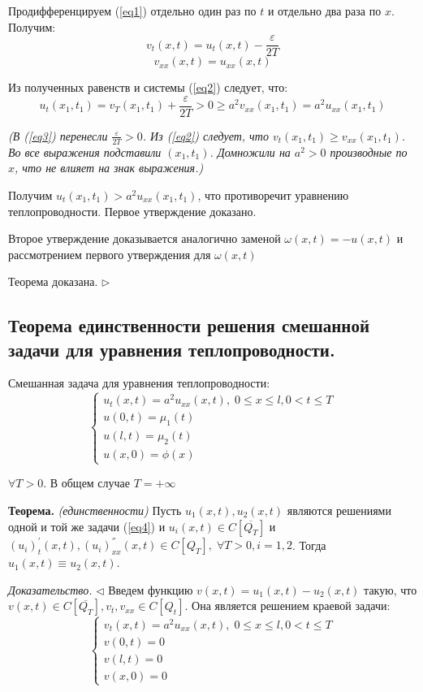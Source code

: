 \documentclass[11pt,a4paper]{article}
\begin{document}
    Продифференцируем (\ref{eq1}) отдельно один раз по $t$ и отдельно два раза по $x$. Получим:
    \begin{equation}
        \label{eq3}
        v_t(x,t) = u_t(x,t) - \frac{\varepsilon}{2T}
    \end{equation}
    $$
    v_{xx}(x,t) = u_{xx}(x,t)
    $$
    
    Из полученных равенств и системы (\ref{eq2}) следует, что:
    $$
    u_t(x_1,t_1) = v_T(x_1,t_1) + \frac{\varepsilon}{2T} > 0 \geqslant a^2v_{xx}(x_1,t_1) = a^2u_{xx}(x_1,t_1)
    $$
    
    \textit{(В (\ref{eq3}) перенесли $\frac{\varepsilon}{2T} > 0$. Из (\ref{eq2}) следует, что $v_t(x_1,t_1) \geq v_{xx}(x_1,t_1)$. Во все выражения подставили $(x_1,t_1)$. Домножили на $a^2 > 0$ производные по $x$, что не влияет на знак выражения.)}
    
    Получим $u_t(x_1,t_1) > a^2u_{xx}(x_1,t_1)$, что противоречит уравнению теплопроводности. Первое утверждение доказано.
    \par
    Второе утверждение доказывается аналогично заменой $\omega(x,t) = -u(x,t)$ и рассмотрением первого утверждения для $\omega(x,t)$
    \par
    Теорема доказана. $\triangleright$
    
    \subsection{Теорема единственности решения смешанной задачи для уравнения теплопроводности.}
    Смешанная задача для уравнения теплопроводности:
    \begin{equation}
      \label{eq4}
      \begin{cases}
          u_t(x,t) = a^2u_{xx}(x,t), \; 0 \leqslant x \leqslant l, 0 < t \leqslant T \\
          u(0, t) = \mu_1(t) \\
          u(l, t) = \mu_2(t) \\
          u(x, 0) = \phi(x)
      \end{cases}
    \end{equation}
   
    $\forall T > 0$. В общем случае $T = +\infty $
    
    \textbf{Теорема.} \textit{(единственности)} Пусть $u_1(x,t),u_2(x,t)$ являются решениями одной и той же задачи (\ref{eq4}) и $u_i(x,t) \in C[\overline{Q_T}]$ и $(u_i)_{t}^{'}(x,t),(u_i)_{xx}^{''}(x,t) \in C[Q_T], \; \forall T > 0, i = 1,2$. Тогда $u_1(x,t) \equiv u_2(x,t)$.
    \par
    \textit{Доказательство.} $\triangleleft$ Введем функцию $v(x,t) = u_1(x,t) - u_2(x,t)$ такую, что $v(x,t) \in C[\overline{Q_T}], v_t, v_{xx} \in C[Q_t]$. Она является решением краевой задачи:
    $$
    \begin{cases}
        v_t(x,t) = a^2u_{xx}(x,t), \; 0 \leqslant x \leqslant l, 0 < t \leqslant T \\
        v(0, t) = 0 \\
        v(l, t) = 0 \\
        v(x, 0) = 0
    \end{cases}
    $$
    
\end{document}
